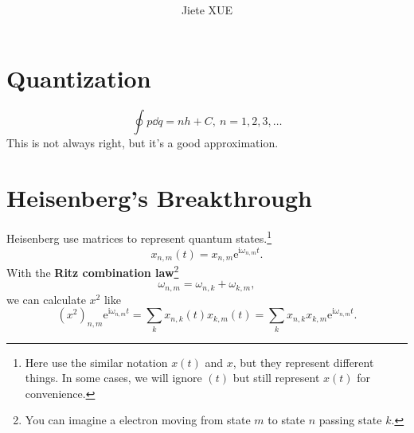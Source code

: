 \documentclass{article}
\title{\textbf{\mytitle}}
\author{Jiete XUE}
\date{\mydate}
\theoremstyle{1}
\newcommand{\ii}{\mathrm{i}}
\newcommand{\ee}{\mathrm{e}}
\begin{document}
\maketitle
\thispagestyle{empty}
\newpage
{}
\setcounter{page}{1}
\tableofcontents
\newpage
{}
\setcounter{page}{1}





\section{Quantization}
\begin{equation}\label{eq 1.1}
    \oint p\dd{q}=n h +C,\ n=1,2,3,\dots 
\end{equation}
This is not always right, but it's a good approximation. 
\section{Heisenberg's Breakthrough}
Heisenberg use matrices to represent quantum states.\footnote{Here use the similar notation $x(t)$ and $x$, but they represent different things. In some cases, we will ignore $(t)$ but still represent $x(t)$ for convenience.}
\begin{equation}
    x_{n,m}(t)=x_{n,m}\ee^{\ii\omega_{n,m}t}.
\end{equation}
With the \textbf{Ritz combination law}\footnote{You can imagine a electron moving from state $m$ to state $n$ passing state $k$.}
\begin{equation}
    \omega_{n,m}=\omega_{n,k}+\omega_{k,m},
\end{equation}
we can calculate $x^2$ like
\begin{equation}
    \left(x^2\right)_{n,m}\ee^{\ii\omega_{n,m}t}=\sum_{k}x_{n,k}(t)x_{k,m}(t)=\sum_{k}x_{n,k}x_{k,m}\ee^{\ii\omega_{n,m}t}.
\end{equation}
\end{document}
